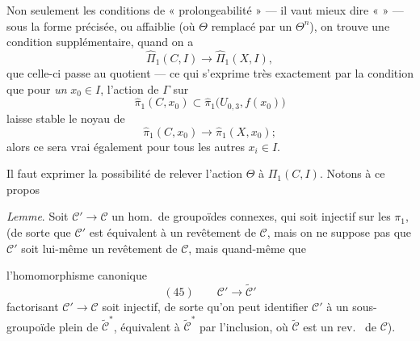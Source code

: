 \documentclass[11pt,a4paper]{article}
\begin{document}
Non seulement les conditions de  « prolongeabilité » --- il vaut mieux dire «  » --- sous la forme précisée, ou affaiblie (où $\Theta$ remplacé par un $\Theta^{n}$), on trouve une condition  supplémentaire, quand on a 
\[
  \hat{\Pi}_1(C, I) \longrightarrow \hat{\Pi}_1(X, I),
\]
que celle-ci passe au quotient --- ce qui s'exprime très exactement par la condition que pour \textit{un} $x_0 \in I$, l'action de $\Gamma$ sur
\[
  \hat{\pi}_1(C, x_0) \subset \hat{\pi}_1\bigl(U_{0,3}, f(x_0)\bigr)
\]
laisse stable le noyau de
\[
  \hat{\pi}_1(C, x_0) \longrightarrow \hat{\pi}_1(X, x_0) ;
\]
alors ce sera vrai également pour tous les autres $x_i \in I$.

Il faut exprimer la possibilité de relever l'action  $\Theta$ à $\Pi_1(C, I)$. Notons à ce propos

\textit{Lemme}. Soit $\mathcal{C}' \to \mathcal{C}$ un hom.\ de groupoïdes connexes, qui soit injectif sur les $\pi_1$, (de sorte que $\mathcal{C}'$ est équivalent à un revêtement de $\mathcal{C}$, mais on ne suppose pas que $\mathcal{C}'$ soit lui-même un revêtement de $\mathcal{C}$, mais quand-même que

l'homomorphisme canonique
\[
  (45) \qquad \mathcal{C}' \longrightarrow \tilde{\mathcal{C}}'
\]
 factorisant $\mathcal{C}' \to \mathcal{C}$ soit injectif, de sorte qu'on peut identifier $\mathcal{C}'$ à un sous-groupoïde plein de $\tilde{\mathcal{C}}^{*}$, équivalent à $\tilde{\mathcal{C}}^{*}$ par l'inclusion, où $\tilde{\mathcal{C}}$ est un rev.\  de $\mathcal{C}$).
\end{document}
